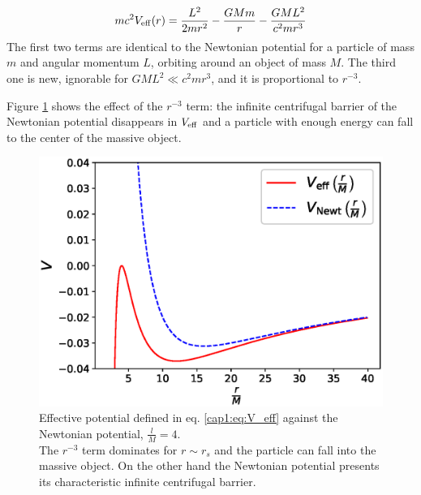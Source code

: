 \begin{equation*}
    m c^2 V_{\rm eff}(r)
    = \frac{L^2}{2 m r^2} - \frac{G M m}{r} - \frac{G M L^2}{c^2 m r^3}
\end{equation*}
The first two terms are identical to the Newtonian potential for a particle of
mass $m$ and angular momentum $L$, orbiting around an object of mass $M$.
The third one is new, ignorable for $GML^2 \ll c^2 m r^3$, and it is proportional to
$r^{-3}$.

Figure \ref{cap1:fig:V_effvsVN} shows the effect of the $r^{-3}$ term: the infinite
centrifugal barrier of the Newtonian potential disappears in $V_{\rm eff}$ and a
particle with enough energy can fall to the center of the massive object.

\begin{figure}[h]
\begin{minipage}{0.49 \textwidth}
    \centering
    \includegraphics[width = \textwidth]{Figures/V_eff.eps}
    \caption{Effective potential defined in eq. \ref{cap1:eq:V_eff} against the
    Newtonian potential, $\frac{l}{M} = 4$. \\
    The $r^{-3}$ term dominates for $r \sim r_s$ and the
    particle can fall into the massive object.
    On the other hand the Newtonian potential presents its characteristic
    infinite centrifugal barrier.}
    \label{cap1:fig:V_effvsVN}
\end{minipage}
\hspace{0.009 \textwidth}
\begin{minipage}{0.49 \textwidth}
    \centering

\end{minipage}
\end{figure}
